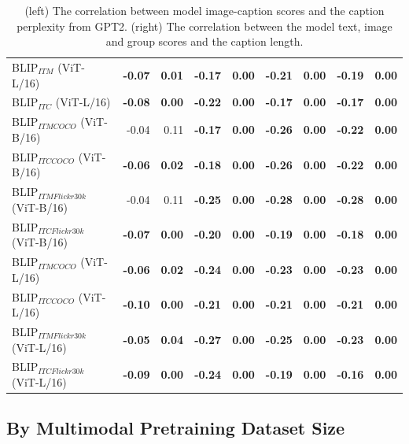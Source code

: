 \begin{table}[ht]
\begin{adjustbox}{max width=\textwidth}
\begin{tabular}{l|rr|rrrrrr}
 BLIP$_{ITM}$ (ViT-L/16)             & \textbf{-0.07} & \textbf{0.01} & \textbf{-0.17} & \textbf{0.00} & \textbf{-0.21} & \textbf{0.00} & \textbf{-0.19} & \textbf{0.00} \\
 BLIP$_{ITC}$ (ViT-L/16)             & \textbf{-0.08} & \textbf{0.00} & \textbf{-0.22} & \textbf{0.00} & \textbf{-0.17} & \textbf{0.00} & \textbf{-0.17} & \textbf{0.00} \\
 BLIP$_{ITM COCO}$ (ViT-B/16)        & -0.04          & 0.11          & \textbf{-0.17} & \textbf{0.00} & \textbf{-0.26} & \textbf{0.00} & \textbf{-0.22} & \textbf{0.00} \\
 BLIP$_{ITC COCO}$ (ViT-B/16)        & \textbf{-0.06} & \textbf{0.02} & \textbf{-0.18} & \textbf{0.00} & \textbf{-0.26} & \textbf{0.00} & \textbf{-0.22} & \textbf{0.00} \\
 BLIP$_{ITM Flickr30k}$ (ViT-B/16)   & -0.04          & 0.11          & \textbf{-0.25} & \textbf{0.00} & \textbf{-0.28} & \textbf{0.00} & \textbf{-0.28} & \textbf{0.00} \\
 BLIP$_{ITC Flickr30k}$ (ViT-B/16)   & \textbf{-0.07} & \textbf{0.00} & \textbf{-0.20} & \textbf{0.00} & \textbf{-0.19} & \textbf{0.00} & \textbf{-0.18} & \textbf{0.00} \\
 BLIP$_{ITM COCO}$ (ViT-L/16)        & \textbf{-0.06} & \textbf{0.02} & \textbf{-0.24} & \textbf{0.00} & \textbf{-0.23} & \textbf{0.00} & \textbf{-0.23} & \textbf{0.00} \\
 BLIP$_{ITC COCO}$ (ViT-L/16)        & \textbf{-0.10} & \textbf{0.00} & \textbf{-0.21} & \textbf{0.00} & \textbf{-0.21} & \textbf{0.00} & \textbf{-0.21} & \textbf{0.00} \\
 BLIP$_{ITM Flickr30k}$ (ViT-L/16)   & \textbf{-0.05} & \textbf{0.04} & \textbf{-0.27} & \textbf{0.00} & \textbf{-0.25} & \textbf{0.00} & \textbf{-0.23} & \textbf{0.00} \\
 BLIP$_{ITC Flickr30k}$ (ViT-L/16)   & \textbf{-0.09} & \textbf{0.00} & \textbf{-0.24} & \textbf{0.00} & \textbf{-0.19} & \textbf{0.00} & \textbf{-0.16} & \textbf{0.00} \\
\bottomrule
\end{tabular}
\end{adjustbox}
\caption{(left) The correlation between model image-caption scores and the caption perplexity from GPT2. (right) The correlation between the model text, image and group scores and the caption length.}
\label{tab:perplexity-and-length-correlations-ours}
\end{table}

\subsection{By Multimodal Pretraining Dataset Size}

